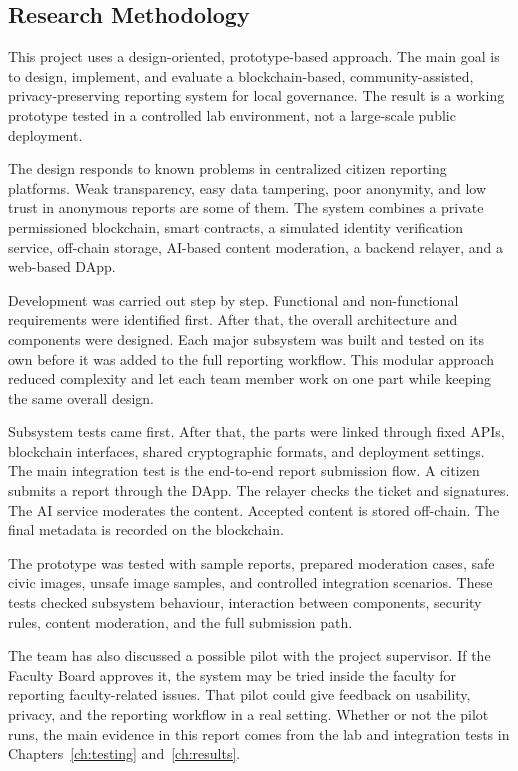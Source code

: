 \subsection{Research Methodology}

This project uses a design-oriented, prototype-based approach. The main goal is to design, implement, and evaluate a blockchain-based, community-assisted, privacy-preserving reporting system for local governance. The result is a working prototype tested in a controlled lab environment, not a large-scale public deployment.

The design responds to known problems in centralized citizen reporting platforms. Weak transparency, easy data tampering, poor anonymity, and low trust in anonymous reports are some of them. The system combines a private permissioned blockchain, smart contracts, a simulated identity verification service, off-chain storage, AI-based content moderation, a backend relayer, and a web-based \ac{DApp}.

Development was carried out step by step. Functional and non-functional requirements were identified first. After that, the overall architecture and components were designed. Each major subsystem was built and tested on its own before it was added to the full reporting workflow. This modular approach reduced complexity and let each team member work on one part while keeping the same overall design.

Subsystem tests came first. After that, the parts were linked through fixed APIs, blockchain interfaces, shared cryptographic formats, and deployment settings. The main integration test is the end-to-end report submission flow. A citizen submits a report through the \ac{DApp}. The relayer checks the ticket and signatures. The AI service moderates the content. Accepted content is stored off-chain. The final metadata is recorded on the blockchain.

The prototype was tested with sample reports, prepared moderation cases, safe civic images, unsafe image samples, and controlled integration scenarios. These tests checked subsystem behaviour, interaction between components, security rules, content moderation, and the full submission path.

The team has also discussed a possible pilot with the project supervisor. If the Faculty Board approves it, the system may be tried inside the faculty for reporting faculty-related issues. That pilot could give feedback on usability, privacy, and the reporting workflow in a real setting. Whether or not the pilot runs, the main evidence in this report comes from the lab and integration tests in Chapters~\ref{ch:testing} and~\ref{ch:results}.

